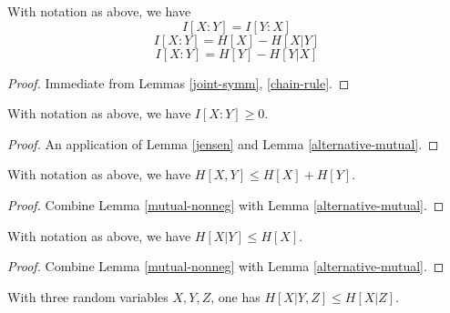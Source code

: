 \begin{lemma}\label{alternative-mutual}
   \leanok
  With notation as above, we have
$$  I[X : Y] = I[Y:X]$$
$$  I[X : Y] = H[X] - H[X|Y]$$
$$  I[X : Y] = H[Y] - H[Y|X]$$
\end{lemma}

\begin{proof}
  \leanok
  Immediate from Lemmas \ref{joint-symm}, \ref{chain-rule}.
\end{proof}

\begin{lemma}\label{mutual-nonneg}
  \label{condMutualInformation_nonneg}
  With notation as above, we have $I[X:Y] \geq 0$.
\end{lemma}

\begin{proof}   An application of Lemma \ref{jensen} and Lemma \ref{alternative-mutual}.
\end{proof}

\begin{corollary}[Subadditivity]\label{subadditive}
  With notation as above, we have $H[X,Y] \leq H[X] + H[Y]$.
\end{corollary}

\begin{proof}
  Combine Lemma \ref{mutual-nonneg} with Lemma \ref{alternative-mutual}.
\end{proof}

\begin{corollary}\label{cond-reduce}
  With notation as above, we have $H[X|Y] \leq H[X]$.
\end{corollary}

\begin{proof}  Combine Lemma \ref{mutual-nonneg} with Lemma \ref{alternative-mutual}.
\end{proof}

\begin{corollary}[Submodularity]\label{submodularity}
  With three random variables $X,Y,Z$, one has $H[X|Y,Z] \leq H[X|Z]$.
\end{corollary}

